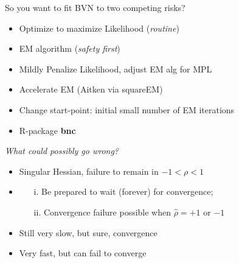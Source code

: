 \documentclass[10pt]{beamer}
\providecommand{\tightlist}{%
\setlength{\itemsep}{0pt}\setlength{\parskip}{0pt}}
\begin{document}
\begin{frame}[fragile]{So you want to fit BVN to two competing risks?}
\protect\hypertarget{so-you-want-to-fit-bvn-to-two-competing-risks}{}
\begin{itemize}
\tightlist
\item<1->
  Optimize to maximize Likelihood (\emph{routine})
  \item<2-> EM algorithm (\emph{safety first}) 
  \item<3-> Mildly
Penalize Likelihood, adjust EM alg for MPL
  \item<4-> Accelerate EM (Aitken via squareEM)
  \item<5-> Change start-point: initial small number of
EM iterations 
  \item<6-> R-package \textbf{bnc}
\end{itemize}

\alert{\emph{What could possibly go wrong?}}
\begin{itemize}
\item<1> Singular Hessian, failure to remain in $-1 < \rho < 1$ 
\item<2>
  \begin{enumerate}
  \item[i.] Be prepared to wait (forever) for convergence;
  \item[ii.] Convergence failure possible when $\hat{\rho} = +1$ or $-1$
  \end{enumerate}
\item<3> Still very slow, but sure, convergence
\item<4> Very fast, but can fail to converge
\end{itemize}
\end{frame}
\end{document}
